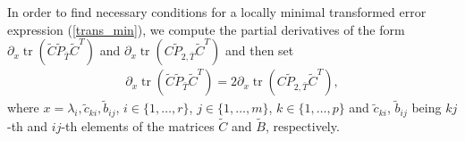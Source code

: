 \documentclass[a4paper,11pt, twoside]{article}
\newcommand{\trace}{\operatorname{tr}}
\begin{document}
In order to find necessary conditions for a locally minimal transformed error expression (\ref{trans_min}), we compute the partial derivatives of the 
form $\partial_x \trace(\tilde C \tilde P_{\bar T} \tilde C^T)$ and $\partial_x \trace(C \tilde P_{2, \bar T} \tilde C^T)$ and then set \begin{align*}
 \partial_x \trace(\tilde C \tilde P_{\bar T} \tilde C^T)=  2 \partial_x \trace(C \tilde P_{2, \bar T} \tilde C^T),                                    
                                                                         \end{align*}
where $x=\lambda_i, \tilde c_{ki}, \tilde b_{ij}$, $i \in \{1,\ldots,r\}$, $j \in \{1,\ldots,m\}$, $k \in \{1,\ldots,p\}$ and $\tilde c_{ki}$, 
$\tilde b_{ij}$ being $kj$-th and $ij$-th elements of the matrices $\tilde C$ and $\tilde B$, respectively.
\end{document}
